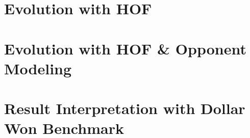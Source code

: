 \section{Evolution with HOF}
\section{Evolution with HOF \& Opponent Modeling}
\section{Result Interpretation with Dollar Won Benchmark}



